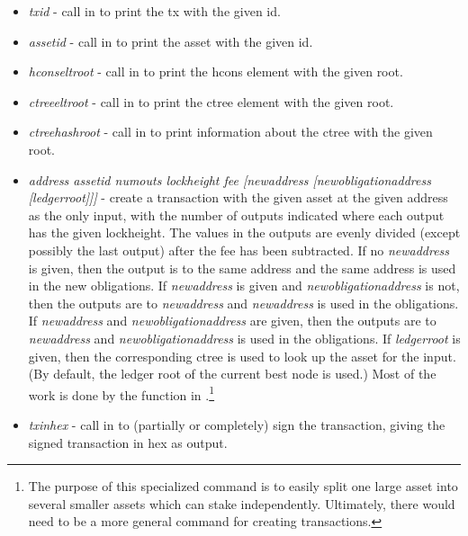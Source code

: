 {\begin{itemize}
\item {} {\it{txid}} - call {} in {}
      to print the tx with the given id.
\item {} {\it{assetid}} - call {} in {}
      to print the asset with the given id.
\item {} {\it{hconseltroot}} - call {} in {}
      to print the hcons element with the given root.
\item {} {\it{ctreeeltroot}} - call {} in {}
      to print the ctree element with the given root.
\item {} {\it{ctreehashroot}} - call {} in {}
      to print information about the ctree with the given root.
\item {} {\it{address assetid numouts lockheight fee [newaddress [newobligationaddress [ledgerroot]]]}} - 
      create a transaction with the given asset at the given address as the only input,
      with the number of outputs indicated
      where each output has the given lockheight.
      The values in the outputs are evenly divided (except possibly the last output) after the fee has been subtracted.
      If no {\it newaddress} is given, then the output is to the same address and the same address is used in the new obligations.
      If {\it newaddress} is given and {\it newobligationaddress} is not, then the outputs
      are to {\it newaddress} and {\it newaddress} is used in the obligations.
      If {\it newaddress} and {\it newobligationaddress} are given, then the outputs
      are to {\it newaddress} and {\it newobligationaddress} is used in the obligations.
      If {\it ledgerroot} is given, then the corresponding ctree is used to look up the asset for the input.
      (By default, the ledger root of the current best node is used.)
      Most of the work is done by the function {} in {}.\footnote{The purpose of this specialized command is to easily split one large asset into several smaller assets which can stake independently. Ultimately, there would need to be a more general command for creating transactions.}
\item {} {\it{txinhex}} - call {} in {} to (partially or completely) sign the transaction, giving the signed transaction in hex as output.

\end{itemize}}
